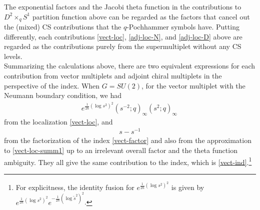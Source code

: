 \documentclass[11pt,hyper,a4paper]{article}
\begin{document}
The exponential factors and the Jacobi theta function in the contributions to $D^2 \times_q S^1$ partition function above can be regarded as the factors that cancel out the (mixed) CS contributions that the $q$-Pochhammer symbols have.
Putting differently, each contributions \eqref{vect-loc}, \eqref{adj-loc-N}, and \eqref{adj-loc-D} above are regarded as the contributions purely from the supermultiplet without any CS levels.	\\



Summarizing the calculations above, there are two equivalent expressions for each contribution from vector multiplets and adjoint chiral multiplets in the perspective of the index.
When $G=SU(2)$, for the vector multiplet with the Neumann boundary condition, we had 
\begin{align}
e^{\frac{1}{2\hbar} (\log s^2)^2 } (s^{-2};q)_\infty (s^{2};q)_\infty	\,	\label{vect-loc-summ1}
\end{align}
from the localization \eqref{vect-loc},
and 
\begin{align}
s-s^{-1}		\label{vect-loc-summ2}
\end{align}
from the factorization of the index \eqref{vect-factor} and also from the approximation to \eqref{vect-loc-summ1} up to an irrelevant overall factor and the theta function ambiguity.
They all give the same contribution to the index, which is \eqref{vect-ind}.\footnote{For explicitness, the identity fusion for $e^{\frac{1}{2\hbar} (\log s^2)^2}$ is given by $e^{\frac{1}{2\hbar} (\log s^2)^2} e^{-\frac{1}{2\hbar} (\log \tilde{s}^2)^2}$.}
\end{document}

